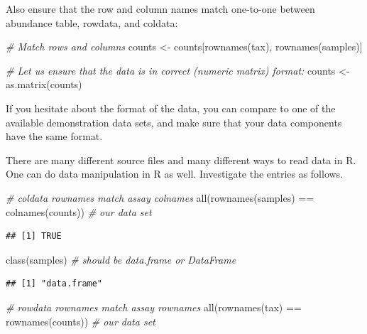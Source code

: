 \documentclass[
]{book}
\newenvironment{Shaded}{\begin{snugshade}}{\end{snugshade}}
\newcommand{\CommentTok}[1]{\textcolor[rgb]{0.56,0.35,0.01}{\textit{#1}}}
\newcommand{\FunctionTok}[1]{\textcolor[rgb]{0.00,0.00,0.00}{#1}}
\newcommand{\NormalTok}[1]{#1}
\newcommand{\OtherTok}[1]{\textcolor[rgb]{0.56,0.35,0.01}{#1}}
\newcommand{\SpecialCharTok}[1]{\textcolor[rgb]{0.00,0.00,0.00}{#1}}
\begin{document}
Also ensure that the row and column names match one-to-one between
abundance table, rowdata, and coldata:

\begin{Shaded}
\begin{Highlighting}[]
\CommentTok{\# Match rows and columns}
\NormalTok{counts }\OtherTok{\textless{}{-}}\NormalTok{ counts[}\FunctionTok{rownames}\NormalTok{(tax), }\FunctionTok{rownames}\NormalTok{(samples)]}

\CommentTok{\# Let us ensure that the data is in correct (numeric matrix) format:}
\NormalTok{counts }\OtherTok{\textless{}{-}} \FunctionTok{as.matrix}\NormalTok{(counts)}
\end{Highlighting}
\end{Shaded}

If you hesitate about the format of the data, you can compare to one
of the available demonstration data sets, and make sure that your data
components have the same format.

There are many different source files and many different ways to read
data in R. One can do data manipulation in R as well. Investigate the
entries as follows.

\begin{Shaded}
\begin{Highlighting}[]
\CommentTok{\# coldata rownames match assay colnames}
\FunctionTok{all}\NormalTok{(}\FunctionTok{rownames}\NormalTok{(samples) }\SpecialCharTok{==} \FunctionTok{colnames}\NormalTok{(counts)) }\CommentTok{\# our data set}
\end{Highlighting}
\end{Shaded}

\begin{verbatim}
## [1] TRUE
\end{verbatim}

\begin{Shaded}
\begin{Highlighting}[]
\FunctionTok{class}\NormalTok{(samples) }\CommentTok{\# should be data.frame or DataFrame}
\end{Highlighting}
\end{Shaded}

\begin{verbatim}
## [1] "data.frame"
\end{verbatim}

\begin{Shaded}
\begin{Highlighting}[]
\CommentTok{\# rowdata rownames match assay rownames}
\FunctionTok{all}\NormalTok{(}\FunctionTok{rownames}\NormalTok{(tax) }\SpecialCharTok{==} \FunctionTok{rownames}\NormalTok{(counts)) }\CommentTok{\# our data set}
\end{Highlighting}
\end{Shaded}
\end{document}

